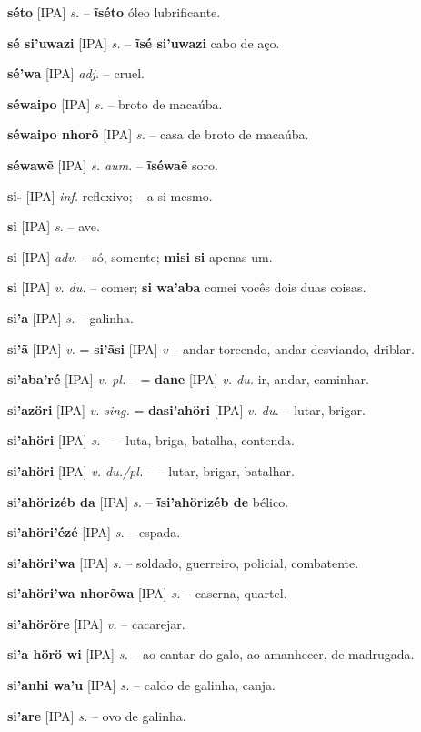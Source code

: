 \textbf{séto} [IPA] \textit{s.} -- \textbf{ĩséto} óleo lubrificante.

\textbf{sé si'uwazi} [IPA] \textit{s.} -- \textbf{ĩsé si'uwazi} cabo de aço.

\textbf{sé'wa} [IPA] \textit{adj.} -- cruel.

\textbf{séwaipo} [IPA] \textit{s.} -- broto de macaúba.

\textbf{séwaipo nhorõ} [IPA] \textit{s.} -- casa de broto de macaúba.

\textbf{séwawẽ} [IPA] \textit{s. aum.} -- \textbf{ĩséwaẽ} soro.

\textbf{si-} [IPA] \textit{inf.} reflexivo; -- a si mesmo.

\textbf{si} [IPA] \textit{s.} -- ave.

\textbf{si} [IPA] \textit{adv.} -- só, somente; \textbf{misi si} apenas um.

\textbf{si} [IPA] \textit{v. du.} -- comer; \textbf{si wa'aba} comei vocês dois duas coisas.

\textbf{si'a} [IPA] \textit{s.} -- galinha.

\textbf{si'ã} [IPA] \textit{v.} = \textbf{si'ãsi} [IPA] \textit{v} -- andar torcendo, andar desviando, driblar.

\textbf{si'aba'ré} [IPA] \textit{v. pl.} -- = \textbf{dane} [IPA] \textit{v. du.} ir, andar, caminhar.

\textbf{si'azöri} [IPA] \textit{v. sing.} = \textbf{dasi'ahöri} [IPA] \textit{v. du.} -- lutar, brigar.

\textbf{si'ahöri} [IPA] \textit{s.} -- -- luta, briga, batalha, contenda.

\textbf{si'ahöri} [IPA] \textit{v. du./pl.} -- -- lutar, brigar, batalhar.

\textbf{si'ahörizéb da} [IPA] \textit{s.} -- \textbf{ĩsi'ahörizéb de} bélico.

\textbf{si'ahöri'ézé} [IPA] \textit{s.} -- espada.

\textbf{si'ahöri'wa} [IPA] \textit{s.} -- soldado, guerreiro, policial, combatente.

\textbf{si'ahöri'wa nhorõwa} [IPA] \textit{s.} -- caserna, quartel.

\textbf{si'ahöröre} [IPA] \textit{v.} -- cacarejar.

\textbf{si'a hörö wi} [IPA] \textit{s.} -- ao cantar do galo, ao amanhecer, de madrugada.

\textbf{si'anhi wa'u} [IPA] \textit{s.} -- caldo de galinha, canja.

\textbf{si'are} [IPA] \textit{s.} -- ovo de galinha.

